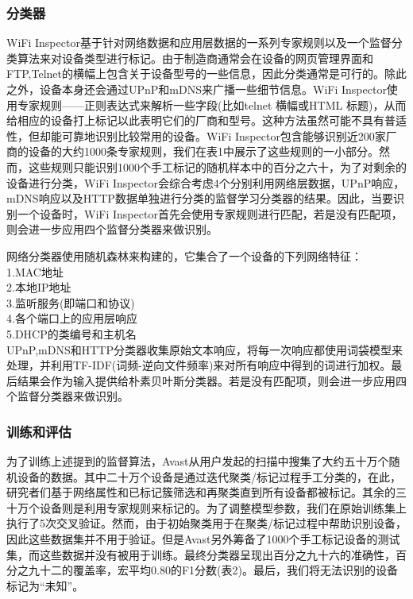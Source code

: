 \documentclass[UTF8]{ctexart}
\begin{document}
	\subsubsection*{分类器}
	WiFi Inspector基于针对网络数据和应用层数据的一系列专家规则以及一个监督分类算法来对设备类型进行标记。由于制造商通常会在设备的网页管理界面和FTP,Telnet的横幅上包含关于设备型号的一些信息，因此分类通常是可行的。除此之外，设备本身还会通过UPnP和mDNS来广播一些细节信息。WiFi Inspector使用专家规则——正则表达式来解析一些字段(比如telnet 横幅或HTML 标题)，从而给相应的设备打上标记以此表明它们的厂商和型号。这种方法虽然可能不具有普适性，但却能可靠地识别比较常用的设备。WiFi Inspector包含能够识别近200家厂商的设备的大约1000条专家规则，我们在表1中展示了这些规则的一小部分。然而，这些规则只能识别1000个手工标记的随机样本中的百分之六十，为了对剩余的设备进行分类，WiFi Inspector会综合考虑4个分别利用网络层数据，UPnP响应，mDNS响应以及HTTP数据单独进行分类的监督学习分类器的结果。因此，当要识别一个设备时，WiFi Inspector首先会使用专家规则进行匹配，若是没有匹配项，则会进一步应用四个监督分类器来做识别。
	
	网络分类器使用随机森林来构建的，它集合了一个设备的下列网络特征：\\
	1.MAC地址\\
	2.本地IP地址\\
	3.监听服务(即端口和协议)\\
	4.各个端口上的应用层响应\\
	5.DHCP的类编号和主机名\\
	UPnP,mDNS和HTTP分类器收集原始文本响应，将每一次响应都使用词袋模型来处理，并利用TF-IDF(词频-逆向文件频率)来对所有响应中得到的词进行加权。最后结果会作为输入提供给朴素贝叶斯分类器。若是没有匹配项，则会进一步应用四个监督分类器来做识别。
	
	\subsubsection*{训练和评估}
	为了训练上述提到的监督算法，Avast从用户发起的扫描中搜集了大约五十万个随机设备的数据。其中二十万个设备是通过迭代聚类/标记过程手工分类的，在此，研究者们基于网络属性和已标记簇筛选和再聚类直到所有设备都被标记。其余的三十万个设备则是利用专家规则来标记的。为了调整模型参数，我们在原始训练集上执行了5次交叉验证。然而，由于初始聚类用于在聚类/标记过程中帮助识别设备，因此这些数据集并不用于验证。但是Avast另外筹备了1000个手工标记设备的测试集，而这些数据并没有被用于训练。最终分类器呈现出百分之九十六的准确性，百分之九十二的覆盖率，宏平均0.80的F1分数(表2)。最后，我们将无法识别的设备标记为“未知”。
	
\end{document}
